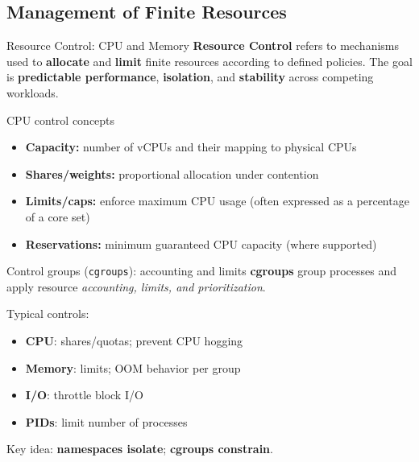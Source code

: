 \subsection{Management of Finite Resources}
\begin{frame}{Resource Control: CPU and Memory}
  \textbf{Resource Control} refers to mechanisms used to \textbf{allocate} and \textbf{limit} finite resources
  according to defined policies. The goal is \textbf{predictable performance},
  \textbf{isolation}, and \textbf{stability} across competing workloads.
  \begin{block}{CPU control concepts}
    \begin{itemize}
      \item \textbf{Capacity:} number of vCPUs and their mapping to physical CPUs
      \item \textbf{Shares/weights:} proportional allocation under contention
      \item \textbf{Limits/caps:} enforce maximum CPU usage (often expressed as a percentage of a core set)
      \item \textbf{Reservations:} minimum guaranteed CPU capacity (where supported)
    \end{itemize}
  \end{block}
\end{frame}


\begin{frame}{Control groups (\texttt{cgroups}): accounting and limits}
  \textbf{cgroups} group processes and apply resource \emph{accounting, limits, and prioritization}.

  \medskip
  Typical controls:
  \begin{itemize}
    \item \textbf{CPU}: shares/quotas; prevent CPU hogging
    \item \textbf{Memory}: limits; OOM behavior per group
    \item \textbf{I/O}: throttle block I/O
    \item \textbf{PIDs}: limit number of processes
  \end{itemize}

  \medskip
  Key idea: \textbf{namespaces isolate}; \textbf{cgroups constrain}.
\end{frame}


